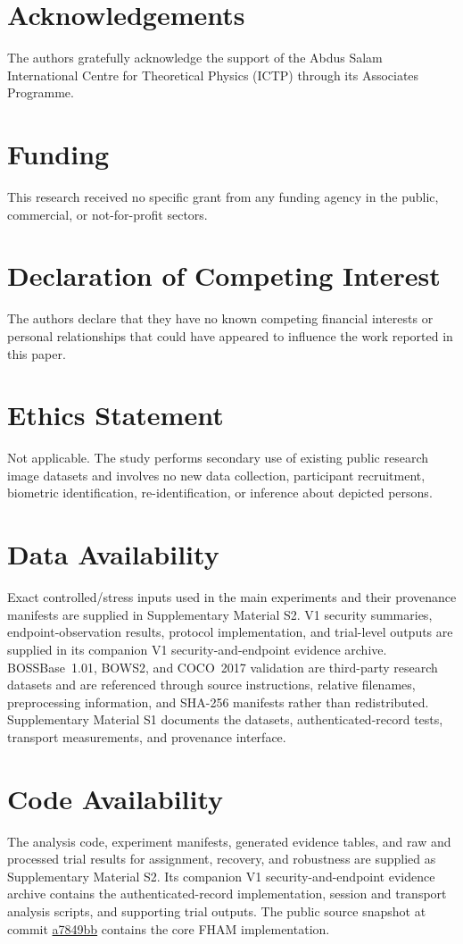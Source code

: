 \documentclass[preprint,12pt]{elsarticle}
\theoremstyle{plain}
\begin{document}
\section*{Acknowledgements}
The authors gratefully acknowledge the support of the Abdus Salam International Centre for Theoretical Physics (ICTP) through its Associates Programme.

\section*{Funding}
This research received no specific grant from any funding agency in the public, commercial, or not-for-profit sectors.
\section*{Declaration of Competing Interest}
The authors declare that they have no known competing financial interests or personal relationships that could have appeared to influence the work reported in this paper.
\section*{Ethics Statement}
Not applicable. The study performs secondary use of existing public research image datasets and involves no new data collection, participant recruitment, biometric identification, re-identification, or inference about depicted persons.
\section*{Data Availability}
Exact controlled/stress inputs used in the main experiments and their provenance manifests are supplied in Supplementary Material S2. V1 security summaries, endpoint-observation results, protocol implementation, and trial-level outputs are supplied in its companion V1 security-and-endpoint evidence archive. BOSSBase~1.01, BOWS2, and COCO~2017 validation are third-party research datasets and are referenced through source instructions, relative filenames, preprocessing information, and SHA-256 manifests rather than redistributed. Supplementary Material S1 documents the datasets, authenticated-record tests, transport measurements, and provenance interface.

\section*{Code Availability}
The analysis code, experiment manifests, generated evidence tables, and raw and processed trial results for assignment, recovery, and robustness are supplied as Supplementary Material S2. Its companion V1 security-and-endpoint evidence archive contains the authenticated-record implementation, session and transport analysis scripts, and supporting trial outputs. The public source snapshot at commit \href{https://github.com/EkodeckStephane/FHAM/tree/a7849bb}{a7849bb} contains the core FHAM implementation.
\end{document}
